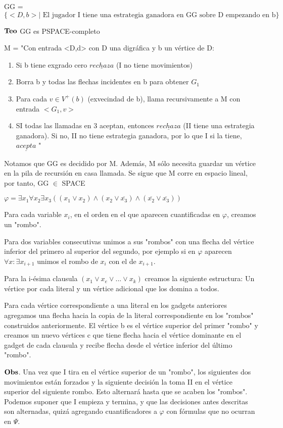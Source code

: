 \documentclass{homework}
\begin{document}
GG = $\{<D,b> | \text{ El jugador I tiene una estrategia ganadora en GG sobre D empezando en b}\}$

$\bf{Teo}$ GG es PSPACE-completo

M = "Con entrada <D,d> con D una digráfica y b un vértice de D:
\begin{enumerate}
	\item Si b tiene exgrado cero $\underline{rechaza}$ (I no tiene movimientos)
	\item Borra b y todas las flechas incidentes en b para obtener $G_1$
	\item Para cada $v \in V^{+}(b)$ (exvecindad de b), llama recursivamente a M con entrada $<G_1, v>$ 
	\item SI todas las llamadas en 3 aceptan, entonces $\underline{rechaza}$ (II tiene una estrategia ganadora). Si no, II no tiene estrategia ganadora, por lo que I si la tiene, $\underline{acepta}$ "
\end{enumerate}

Notamos que GG es decidido por M. Además, M sólo necesita guardar un vértice en la pila de recursión en casa llamada. Se sigue que M corre en espacio lineal, por tanto, GG $\in$ SPACE

$\varphi = \exists x_1\forall x_2 \exists x_3 ((x_1 \vee x_2) \wedge (x_2 \vee \overline{x_3}) \wedge (\overline{x_2} \vee \overline{x_3}))$

Para cada variable $x_i$, en el orden en el que aparecen cuantificadas en $\varphi$, creamos un "rombo".

Para dos variables consecutivas unimos a sus "rombos" con una flecha del vértice inferior del primero al superior del segundo, por ejemplo si en $\varphi$ aparecen $\forall x: \exists x_{i+1} $ unimos el rombo de $x_i$ con el de $x_{i+1}$.

Para la i-ésima clausula $(x_1 \vee x_e \vee ... \vee x_k )$ creamos la siguiente estructura: Un vértice por cada literal y un vértice adicional que los domina a todos.

Para cada vértice correspondiente a una literal en los gadgets anteriores agregamos una flecha hacia la copia de la literal correspondiente en los "rombos" construidos anteriormente. El vértice b es el vértice superior del primer "rombo" y creamos un nuevo vértices c que tiene flecha hacia el vértice dominante en el gadget de cada clausula y recibe flecha desde el vértice inferior del último "rombo".

$\bf{Obs}$. Una vez que I tira en el vértice superior de un "rombo", los siguientes dos movimientos están forzados y la siguiente decisión la toma II en el vértice superior del siguiente rombo. Esto alternará hasta que se acaben los "rombos".
Podemos suponer que I empieza y termina, y que las decisiones antes descritas son alternadas, quizá agregando cuantificadores a $\varphi$ con fórmulas que no ocurran en $\varPsi$.
\end{document}
